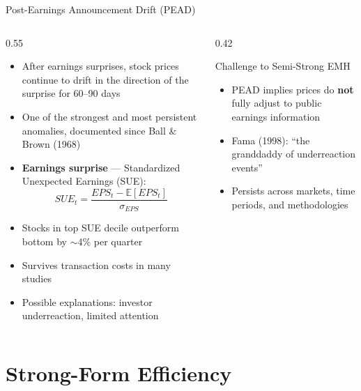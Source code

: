 \documentclass[9pt, aspectratio=169, t]{beamer}
\theoremstyle{definition}
\newenvironment{cminipage}[1]{%
    \par\noindent\hfill\begin{minipage}{#1}\ignorespaces
}{%
    \end{minipage}\hfill\null\par
}
\newcommand{\E}{\mathbb{E}}
\begin{document}
\begin{frame}{Post-Earnings Announcement Drift (PEAD)}
\begin{cminipage}{0.95\textwidth}
\begin{columns}[T]
\begin{column}{0.55\textwidth}
\begin{itemize}\setlength{\itemsep}{0pt}
    \item After earnings surprises, stock prices continue to drift in the direction of the surprise for 60--90 days
    \item One of the strongest and most persistent anomalies, documented since Ball \& Brown (1968)
    \item \textbf{Earnings surprise} --- Standardized Unexpected Earnings (SUE):
    $$SUE_t = \frac{EPS_t - \E[EPS_t]}{\sigma_{EPS}}$$
    \item Stocks in top SUE decile outperform bottom by $\sim$4\% per quarter
    \item Survives transaction costs in many studies
    \item Possible explanations: investor underreaction, limited attention
\end{itemize}
\end{column}
\begin{column}{0.42\textwidth}
\begin{alertblock}{Challenge to Semi-Strong EMH}
\begin{itemize}\setlength{\itemsep}{0pt}
    \item PEAD implies prices do \textbf{not} fully adjust to public earnings information
    \item Fama (1998): ``the granddaddy of underreaction events''
    \item Persists across markets, time periods, and methodologies
\end{itemize}
\end{alertblock}
\end{column}
\end{columns}
\end{cminipage}
\end{frame}

\section{Strong-Form Efficiency}
\end{document}
